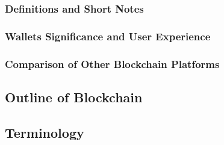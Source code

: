 \documentclass[letterpaper,11pt]{article}
\begin{document}
\subsubsection{Definitions and Short Notes}


\subsubsection{Wallets Significance and User Experience}


\subsubsection{Comparison of Other Blockchain Platforms}


\subsection{Outline of Blockchain}	

	
\subsection{Terminology}
\end{document}
